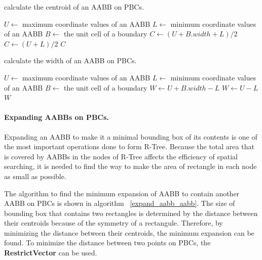 \documentclass[10pt,letterpaper,twocolumn]{article}
\begin{document}
\begin{algorithm}
    \caption{calculate the centroid of an AABB on PBCs.}
    \label{center_aabb}
    \begin{algorithmic}
        \State $U \gets$ maximum coordinate values of an AABB
        \State $L \gets$ minimum coordinate values of an AABB
        \State $B \gets$ the unit cell of a boundary
                \State $C \gets (U + B.width + L) / 2$
            \Else
                \State $C \gets (U + L) / 2$
            \EndIf
            \State \Return $C$
        \EndFunction
     \end{algorithmic}
\end{algorithm}

\begin{algorithm}
    \caption{calculate the width of an AABB on PBCs.}
    \label{radius_aabb}
    \begin{algorithmic}
        \State $U \gets$ maximum coordinate values of an AABB
        \State $L \gets$ minimum coordinate values of an AABB
        \State $B \gets$ the unit cell of a boundary
                \State $W \gets U + B.width - L$
            \Else
                \State $W \gets U - L$
            \EndIf
            \State \Return $W$
        \EndFunction
     \end{algorithmic}
\end{algorithm}

\paragraph{Expanding AABBs on PBCs.}
Expanding an AABB to make it a minimal bounding box of its contents is one of
the most important operations done to form R-Tree.
Because the total area that is covered by AABBs in the nodes of R-Tree affects
the efficiency of spatial searching, it is needed to find the way to make the
area of rectangle in each node as small as possible.

The algorithm to find the minimum expansion of AABB to contain another AABB on
PBCs is shown in algorithm ~\ref{expand_aabb_aabb}.
The size of bounding box that contains two rectangles is determined by the
distance between their centroids because of the symmetry of a rectangule.
Therefore, by minimizing the distance between their centroids, the minimum
expansion can be found. To minimize the distance between two points on PBCs,
the \textbf{RestrictVector} can be used.
\end{document}
